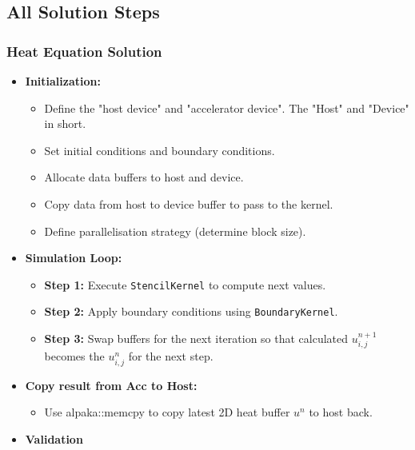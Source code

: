 \documentclass[9pt]{beamer}
\begin{document}
\subsection{All Solution Steps}
\begin{frame}
\frametitle{Heat Equation Solution}
\begin{itemize}
    \item \textbf{Initialization:}
    \begin{itemize}
        \item Define the "host device" and "accelerator device". The "Host" and "Device" in short.
        \item Set initial conditions and boundary conditions.
        \item Allocate data buffers to host and device.
        \item Copy data from host to device buffer to pass to the kernel.
        \item Define parallelisation strategy (determine block size).
    \end{itemize}
    \item \textbf{Simulation Loop:}
    \begin{itemize}
        \item \textbf{Step 1:} Execute \texttt{StencilKernel} to compute next values.
        \item \textbf{Step 2:} Apply boundary conditions using \texttt{BoundaryKernel}.
        \item \textbf{Step 3:} Swap buffers for the next iteration so that calculated  $u_{i,j}^{n+1}$ becomes the $u_{i,j}^{n}$ for the next step.
    \end{itemize}
    \item \textbf{Copy result from Acc to Host:}
    \begin{itemize}
        \item Use alpaka::memcpy to copy latest 2D heat buffer $u^{n}$ to host back.
    \end{itemize}
    \item \textbf{Validation}
\end{itemize}
\end{frame}
\end{document}

